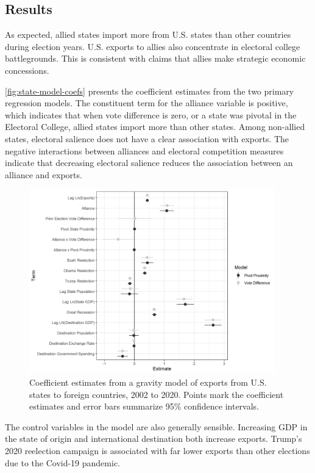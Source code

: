 \documentclass[12pt]{article}
\begin{document}
\subsection{Results}

As expected, allied states import more from U.S. states than other countries during election years. 
U.S. exports to allies also concentrate in electoral college battlegrounds. 
This is consistent with claims that allies make strategic economic concessions. 


\autoref{fig:state-model-coefs} presents the coefficient estimates from the two primary regression models. 
The constituent term for the alliance variable is positive, which indicates that when vote difference is zero, or a state was pivotal in the Electoral College, allied states import more than other states. 
Among non-allied states, electoral salience does not have a clear association with exports. 
The negative interactions between alliances and electoral competition measures indicate that decreasing electoral salience reduces the association between an alliance and exports. 



\begin{figure}[htpb]
	\centering
		\includegraphics[width=0.95\textwidth]{../figures/state-model-coefs.png}
	\caption{Coefficient estimates from a gravity model of exports from U.S. states to foreign countries, 2002 to 2020. Points mark the coefficient estimates and error bars summarize 95\% confidence intervals.}
	\label{fig:state-model-coefs}
\end{figure}


The control variables in the model are also generally sensible. 
Increasing GDP in the state of origin and international destination both increase exports. 
Trump's 2020 reelection campaign is associated with far lower exports than other elections due to the Covid-19 pandemic. 
\end{document}
